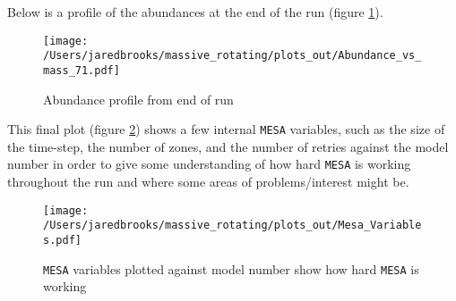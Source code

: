 \documentclass{article}
\begin{document}
        \pagebreak

        Below is a profile of the abundances at the end of the run (figure \ref{fig:14}).

        \begin{figure}[H]
          \centering
          \texttt{[image: /Users/jaredbrooks/massive\_rotating/plots\_out/Abundance\_vs\_mass\_71.pdf]}
          \caption{Abundance profile from end of run}
          \label{fig:14}
        \end{figure}

        \pagebreak

        This final plot (figure \ref{fig:15}) shows a few internal \texttt{MESA} variables, such as the size of the time-step, the number of zones, and the number of retries against the model number in order to give some understanding of how hard \texttt{MESA} is working throughout the run and where some areas of problems/interest might be.

        \begin{figure}[H]
          \centering
          \texttt{[image: /Users/jaredbrooks/massive\_rotating/plots\_out/Mesa\_Variables.pdf]}
          \caption{\texttt{MESA} variables plotted against model number show how hard \texttt{MESA} is working}
          \label{fig:15}
        \end{figure}
\end{document}
